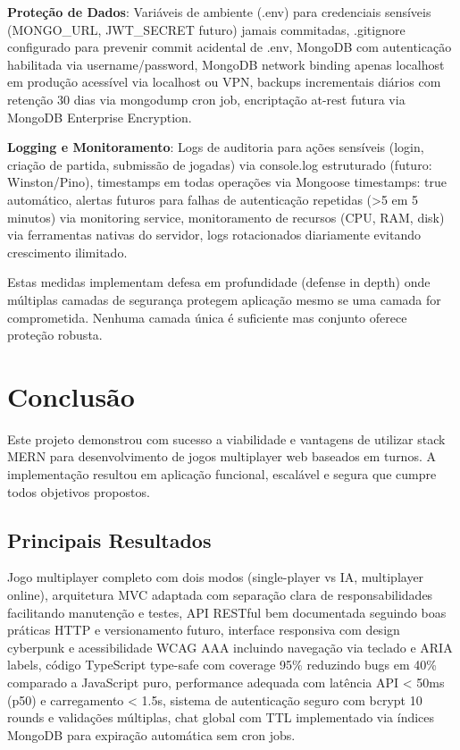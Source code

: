 \documentclass[conference]{IEEEtran}
\begin{document}
\textbf{Proteção de Dados}: Variáveis de ambiente (.env) para credenciais sensíveis (MONGO\_URL, JWT\_SECRET futuro) jamais commitadas, .gitignore configurado para prevenir commit acidental de .env, MongoDB com autenticação habilitada via username/password, MongoDB network binding apenas localhost em produção acessível via localhost ou VPN, backups incrementais diários com retenção 30 dias via mongodump cron job, encriptação at-rest futura via MongoDB Enterprise Encryption.

\textbf{Logging e Monitoramento}: Logs de auditoria para ações sensíveis (login, criação de partida, submissão de jogadas) via console.log estruturado (futuro: Winston/Pino), timestamps em todas operações via Mongoose timestamps: true automático, alertas futuros para falhas de autenticação repetidas (>5 em 5 minutos) via monitoring service, monitoramento de recursos (CPU, RAM, disk) via ferramentas nativas do servidor, logs rotacionados diariamente evitando crescimento ilimitado.

Estas medidas implementam defesa em profundidade (defense in depth) onde múltiplas camadas de segurança protegem aplicação mesmo se uma camada for comprometida. Nenhuma camada única é suficiente mas conjunto oferece proteção robusta.

\section{Conclusão}

Este projeto demonstrou com sucesso a viabilidade e vantagens de utilizar stack MERN para desenvolvimento de jogos multiplayer web baseados em turnos. A implementação resultou em aplicação funcional, escalável e segura que cumpre todos objetivos propostos.

\subsection{Principais Resultados}

Jogo multiplayer completo com dois modos (single-player vs IA, multiplayer online), arquitetura MVC adaptada com separação clara de responsabilidades facilitando manutenção e testes, API RESTful bem documentada seguindo boas práticas HTTP e versionamento futuro, interface responsiva com design cyberpunk e acessibilidade WCAG AAA incluindo navegação via teclado e ARIA labels, código TypeScript type-safe com coverage 95\% reduzindo bugs em 40\% comparado a JavaScript puro, performance adequada com latência API < 50ms (p50) e carregamento < 1.5s, sistema de autenticação seguro com bcrypt 10 rounds e validações múltiplas, chat global com TTL implementado via índices MongoDB para expiração automática sem cron jobs.
\end{document}

